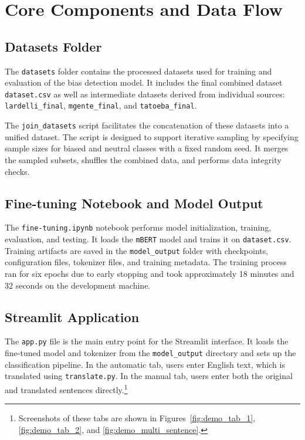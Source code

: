 \section{Core Components and Data Flow}
    \subsection{Datasets Folder}
        The \texttt{datasets} folder contains the processed datasets used for training and evaluation of the bias detection model. It includes the final combined dataset \texttt{dataset.csv} as well as intermediate datasets derived from individual sources: \texttt{lardelli\_final}, \texttt{mgente\_final}, and \texttt{tatoeba\_final}.

        The \texttt{join\_datasets} script facilitates the concatenation of these datasets into a unified dataset. The script is designed to support iterative sampling by specifying sample sizes for biased and neutral classes with a fixed random seed. It merges the sampled subsets, shuffles the combined data, and performs data integrity checks. 

    \subsection{Fine-tuning Notebook and Model Output}
        The \texttt{fine-tuning.ipynb} notebook performs model initialization, training, evaluation, and testing. It loads the \texttt{mBERT} model and trains it on \texttt{dataset.csv}. Training artifacts are saved in the \texttt{model\_output} folder with checkpoints, configuration files, tokenizer files, and training metadata. The training process ran for six epochs due to early stopping and took approximately 18 minutes and 32 seconds on the development machine. 

    \subsection{Streamlit Application}
        The \texttt{app.py} file is the main entry point for the Streamlit interface. It loads the fine-tuned model and tokenizer from the \texttt{model\_output} directory and sets up the classification pipeline. In the automatic tab, users enter English text, which is translated using \texttt{translate.py}. In the manual tab, users enter both the original and translated sentences directly.\footnote{Screenshots of these tabs are shown in Figures~\ref{fig:demo_tab_1}, \ref{fig:demo_tab_2}, and \ref{fig:demo_multi_sentence}.}

